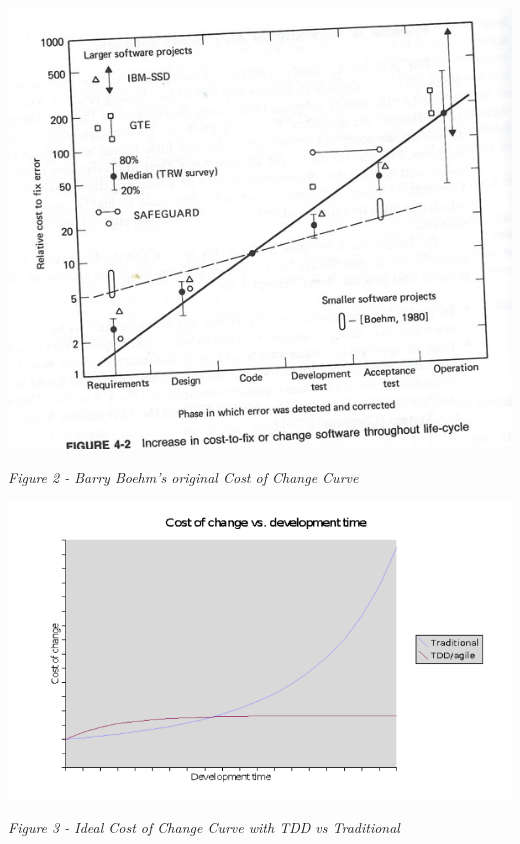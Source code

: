 \documentclass{scrartcl}
\begin{document}
\begin{center}
\includegraphics[scale=0.4]{costofchange.png}
\end{center}

\begin{center}
\textit{Figure 2 - Barry Boehm's original Cost of Change Curve }
\end{center}

\begin{center}
\includegraphics[scale=0.6]{newcostofchange.png}
\end{center}

\begin{center}
\textit{Figure 3 - Ideal Cost of Change Curve with TDD vs Traditional}
\end{center}
\end{document}
